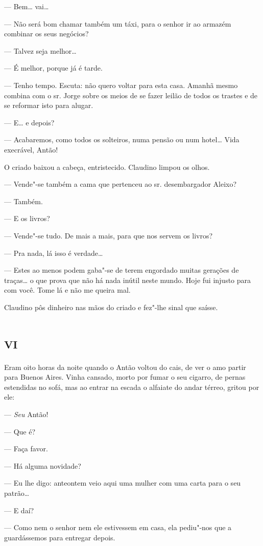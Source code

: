 --- Bem\ldots{} vai\ldots{}

--- Não será bom chamar também um táxi, para o senhor ir ao armazém
combinar os seus negócios?

--- Talvez seja melhor\ldots{}

--- É melhor, porque já é tarde.

--- Tenho tempo. Escuta: não quero voltar para esta casa. Amanhã mesmo
combina com o sr. Jorge sobre os meios de se fazer leilão de todos os
trastes e de se reformar isto para alugar.

--- E\ldots{} e depois?

--- Acabaremos, como todos os solteiros, numa pensão ou num hotel\ldots{}
Vida execrável, Antão!

O criado baixou a cabeça, entristecido. Claudino limpou os olhos.

--- Vende"-se também a cama que pertenceu ao sr. desembargador Aleixo?

--- Também.

--- E os livros?

--- Vende"-se tudo. De mais a mais, para que nos servem os livros?

--- Pra nada, lá isso é verdade\ldots{}

--- Estes ao menos podem gaba"-se de terem engordado muitas gerações de
traças\ldots{} o que prova que não há nada inútil neste mundo. Hoje fui
injusto para com você. Tome lá e não me queira mal.

Claudino pôs dinheiro nas mãos do criado e fez"-lhe sinal que saísse.

\section*{\textsc{vi}}

Eram oito horas da noite quando o Antão voltou do cais, de ver o amo
partir para Buenos Aires. Vinha cansado, morto por fumar o seu cigarro,
de pernas estendidas no sofá, mas ao entrar na escada o alfaiate do
andar térreo, gritou por ele:

--- \emph{Seu} Antão!

--- Que é?

--- Faça favor.

--- Há alguma novidade?

--- Eu lhe digo: anteontem veio aqui uma mulher com uma carta para o seu
patrão\ldots{}

--- E daí?

--- Como nem o senhor nem ele estivessem em casa, ela pediu"-nos que a
guardássemos para entregar depois.

